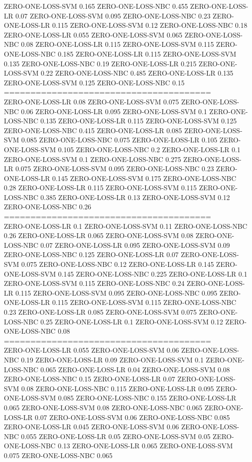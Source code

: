\documentclass[12pt]{article}
\begin{document}
ZERO-ONE-LOSS-SVM 0.165
ZERO-ONE-LOSS-NBC 0.455
ZERO-ONE-LOSS-LR 0.07
ZERO-ONE-LOSS-SVM 0.095
ZERO-ONE-LOSS-NBC 0.23
ZERO-ONE-LOSS-LR 0.115
ZERO-ONE-LOSS-SVM 0.12
ZERO-ONE-LOSS-NBC 0.18
ZERO-ONE-LOSS-LR 0.055
ZERO-ONE-LOSS-SVM 0.065
ZERO-ONE-LOSS-NBC 0.08
ZERO-ONE-LOSS-LR 0.115
ZERO-ONE-LOSS-SVM 0.115
ZERO-ONE-LOSS-NBC 0.185
ZERO-ONE-LOSS-LR 0.115
ZERO-ONE-LOSS-SVM 0.135
ZERO-ONE-LOSS-NBC 0.19
ZERO-ONE-LOSS-LR 0.215
ZERO-ONE-LOSS-SVM 0.22
ZERO-ONE-LOSS-NBC 0.485
ZERO-ONE-LOSS-LR 0.135
ZERO-ONE-LOSS-SVM 0.125
ZERO-ONE-LOSS-NBC 0.15\\
=======================================\\
ZERO-ONE-LOSS-LR 0.08
ZERO-ONE-LOSS-SVM 0.075
ZERO-ONE-LOSS-NBC 0.06
ZERO-ONE-LOSS-LR 0.095
ZERO-ONE-LOSS-SVM 0.1
ZERO-ONE-LOSS-NBC 0.135
ZERO-ONE-LOSS-LR 0.115
ZERO-ONE-LOSS-SVM 0.125
ZERO-ONE-LOSS-NBC 0.415
ZERO-ONE-LOSS-LR 0.085
ZERO-ONE-LOSS-SVM 0.085
ZERO-ONE-LOSS-NBC 0.075
ZERO-ONE-LOSS-LR 0.105
ZERO-ONE-LOSS-SVM 0.105
ZERO-ONE-LOSS-NBC 0.2
ZERO-ONE-LOSS-LR 0.1
ZERO-ONE-LOSS-SVM 0.1
ZERO-ONE-LOSS-NBC 0.275
ZERO-ONE-LOSS-LR 0.075
ZERO-ONE-LOSS-SVM 0.095
ZERO-ONE-LOSS-NBC 0.23
ZERO-ONE-LOSS-LR 0.145
ZERO-ONE-LOSS-SVM 0.175
ZERO-ONE-LOSS-NBC 0.28
ZERO-ONE-LOSS-LR 0.115
ZERO-ONE-LOSS-SVM 0.115
ZERO-ONE-LOSS-NBC 0.385
ZERO-ONE-LOSS-LR 0.13
ZERO-ONE-LOSS-SVM 0.12
ZERO-ONE-LOSS-NBC 0.26\\
=======================================\\
ZERO-ONE-LOSS-LR 0.1
ZERO-ONE-LOSS-SVM 0.11
ZERO-ONE-LOSS-NBC 0.26
ZERO-ONE-LOSS-LR 0.065
ZERO-ONE-LOSS-SVM 0.08
ZERO-ONE-LOSS-NBC 0.07
ZERO-ONE-LOSS-LR 0.095
ZERO-ONE-LOSS-SVM 0.09
ZERO-ONE-LOSS-NBC 0.125
ZERO-ONE-LOSS-LR 0.07
ZERO-ONE-LOSS-SVM 0.075
ZERO-ONE-LOSS-NBC 0.12
ZERO-ONE-LOSS-LR 0.145
ZERO-ONE-LOSS-SVM 0.145
ZERO-ONE-LOSS-NBC 0.225
ZERO-ONE-LOSS-LR 0.1
ZERO-ONE-LOSS-SVM 0.115
ZERO-ONE-LOSS-NBC 0.24
ZERO-ONE-LOSS-LR 0.115
ZERO-ONE-LOSS-SVM 0.095
ZERO-ONE-LOSS-NBC 0.095
ZERO-ONE-LOSS-LR 0.115
ZERO-ONE-LOSS-SVM 0.115
ZERO-ONE-LOSS-NBC 0.23
ZERO-ONE-LOSS-LR 0.085
ZERO-ONE-LOSS-SVM 0.075
ZERO-ONE-LOSS-NBC 0.25
ZERO-ONE-LOSS-LR 0.1
ZERO-ONE-LOSS-SVM 0.12
ZERO-ONE-LOSS-NBC 0.08\\
=======================================\\
ZERO-ONE-LOSS-LR 0.055
ZERO-ONE-LOSS-SVM 0.06
ZERO-ONE-LOSS-NBC 0.19
ZERO-ONE-LOSS-LR 0.09
ZERO-ONE-LOSS-SVM 0.1
ZERO-ONE-LOSS-NBC 0.065
ZERO-ONE-LOSS-LR 0.04
ZERO-ONE-LOSS-SVM 0.08
ZERO-ONE-LOSS-NBC 0.15
ZERO-ONE-LOSS-LR 0.07
ZERO-ONE-LOSS-SVM 0.08
ZERO-ONE-LOSS-NBC 0.115
ZERO-ONE-LOSS-LR 0.095
ZERO-ONE-LOSS-SVM 0.085
ZERO-ONE-LOSS-NBC 0.155
ZERO-ONE-LOSS-LR 0.065
ZERO-ONE-LOSS-SVM 0.08
ZERO-ONE-LOSS-NBC 0.065
ZERO-ONE-LOSS-LR 0.07
ZERO-ONE-LOSS-SVM 0.06
ZERO-ONE-LOSS-NBC 0.085
ZERO-ONE-LOSS-LR 0.045
ZERO-ONE-LOSS-SVM 0.06
ZERO-ONE-LOSS-NBC 0.055
ZERO-ONE-LOSS-LR 0.05
ZERO-ONE-LOSS-SVM 0.05
ZERO-ONE-LOSS-NBC 0.13
ZERO-ONE-LOSS-LR 0.065
ZERO-ONE-LOSS-SVM 0.075
ZERO-ONE-LOSS-NBC 0.065\\
\end{document}
